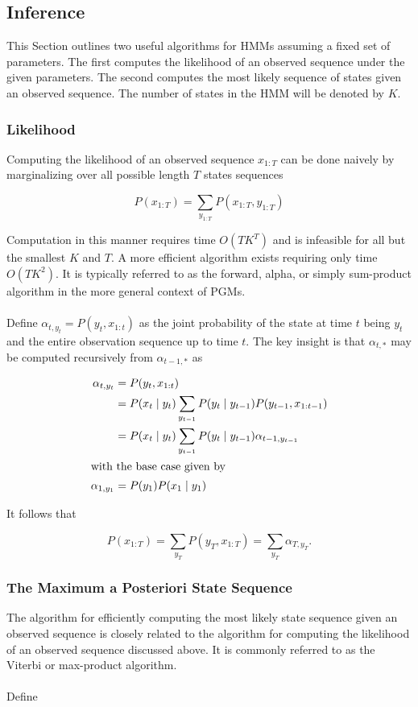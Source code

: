 \documentclass[12pt]{report}
\newcommand{\1}[0]{\mathbbm{1}}
\newcommand{\seq}[3]{\ensuremath{#1_{{#2}:{#3}}}}
\begin{document}
\subsection{Inference}
This Section outlines two useful algorithms for \acp{HMM}
assuming a fixed set of parameters. The first computes the
likelihood of an observed sequence under the given parameters.
The second computes the most likely sequence of states given
an observed sequence. The number of states in the \ac{HMM} will
be denoted by $K$.

\subsubsection{Likelihood}
Computing the likelihood of an observed sequence $\seq{x}{1}{T}$ can be done naively
by marginalizing over all possible length $T$ states sequences

\[
    P(\seq{x}{1}{T}) = \sum_{\seq{y}{1}{T}} P(\seq{x}{1}{T}, \seq{y}{1}{T})
\]

Computation in this manner requires time $O(TK^T)$ and is infeasible for all
but the smallest $K$ and $T$. A more efficient algorithm exists requiring only time
$O(TK^2)$. It is typically referred to as the forward, alpha, or
simply sum-product algorithm in the more general context of \acp{PGM}.
\\\\
Define $\alpha_{t,y_t} = P(y_t, \seq{x}{1}{t})$ as the joint probability
of the state at time $t$ being $y_t$ and the entire observation sequence up to
time $t$. The key insight is that $\alpha_{t,*}$ may be computed recursively
from $\alpha_{t-1,*}$ as

\begin{align*}
    \alpha_{t,y_t}
    &= P(y_t, \seq{x}{1}{t}) \\
    &= P(x_t \mid y_t) \sum_{y_{t-1}} P(y_t \mid y_{t-1}) P(y_{t-1}, \seq{x}{1}{t-1}) \\
    &= P(x_t \mid y_t) \sum_{y_{t-1}} P(y_t \mid y_{t-1}) \alpha_{t-1,y_{t-1}} \\
\intertext{with the base case given by}
    \alpha_{1,y_1} &= P(y_1)P(x_1 \mid y_1)\\
\end{align*}

It follows that

\[
    P(\seq{x}{1}{T}) = \sum_{y_T} P(y_T, \seq{x}{1}{T}) = \sum_{y_T} \alpha_{T,y_T}.
\]

\subsubsection{The Maximum a Posteriori State Sequence}
The algorithm for efficiently computing the most likely state sequence given an
observed sequence is closely related to the algorithm for computing the likelihood
of an observed sequence discussed above.
It is commonly referred to as the Viterbi or max-product algorithm.
\\\\
Define
\end{document}
